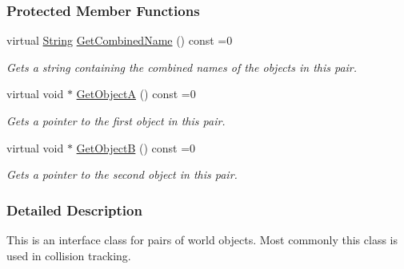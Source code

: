 \subsubsection*{Protected Member Functions}
\begin{DoxyCompactItemize}
\item 
\hypertarget{classMezzanine_1_1ObjectPair_a2034dd4280f0bb303b6d92fa0afc2020}{
virtual \hyperlink{namespaceMezzanine_acf9fcc130e6ebf08e3d8491aebcf1c86}{String} \hyperlink{classMezzanine_1_1ObjectPair_a2034dd4280f0bb303b6d92fa0afc2020}{GetCombinedName} () const =0}
\label{classMezzanine_1_1ObjectPair_a2034dd4280f0bb303b6d92fa0afc2020}

\begin{DoxyCompactList}\small\item\em Gets a string containing the combined names of the objects in this pair. \item\end{DoxyCompactList}\item 
\hypertarget{classMezzanine_1_1ObjectPair_a832fb244c1f59e649d70f600afa620c7}{
virtual void $\ast$ \hyperlink{classMezzanine_1_1ObjectPair_a832fb244c1f59e649d70f600afa620c7}{GetObjectA} () const =0}
\label{classMezzanine_1_1ObjectPair_a832fb244c1f59e649d70f600afa620c7}

\begin{DoxyCompactList}\small\item\em Gets a pointer to the first object in this pair. \item\end{DoxyCompactList}\item 
\hypertarget{classMezzanine_1_1ObjectPair_a96db81279c4cb2ebf845aac6dc0f7494}{
virtual void $\ast$ \hyperlink{classMezzanine_1_1ObjectPair_a96db81279c4cb2ebf845aac6dc0f7494}{GetObjectB} () const =0}
\label{classMezzanine_1_1ObjectPair_a96db81279c4cb2ebf845aac6dc0f7494}

\begin{DoxyCompactList}\small\item\em Gets a pointer to the second object in this pair. \item\end{DoxyCompactList}\end{DoxyCompactItemize}


\subsubsection{Detailed Description}
This is an interface class for pairs of world objects. Most commonly this class is used in collision tracking. 


